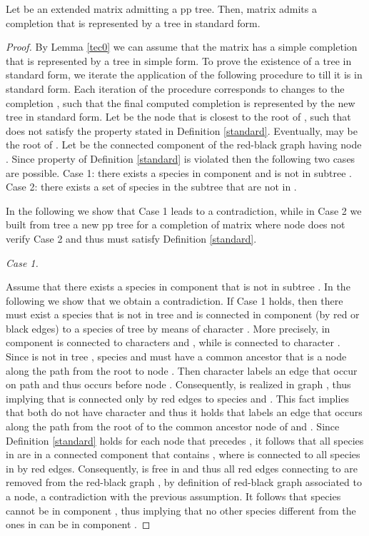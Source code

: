 \documentclass{llncs}
\begin{document}
\begin{lemma}
\label{tec1}
Let   be an extended matrix admitting a pp tree. Then, matrix  admits a completion that is represented by a tree  in standard form.
\end{lemma}

\begin{proof}
By Lemma  \ref{tec0} we can assume that the matrix  has a simple completion  
that is represented by a tree  in simple form.
To prove the existence of a tree  in standard form, we iterate the application of the following procedure to  till it is in standard form.  Each iteration of the procedure corresponds to changes to the completion ,
such that the  final computed completion   is represented by the new tree in standard form. 
Let  be the node that is closest to the root  of , such that  does not satisfy  the property stated in Definition \ref{standard}.  Eventually,  may be the root of .
 Let  be the connected component of  the red-black graph   having node .  Since property of   Definition \ref{standard} is violated then the following two cases are possible.
Case 1: there exists a species  in component  and  is not in subtree .
Case 2:  there exists a set  of species in the subtree  that are not in .


In the following we show that Case 1 leads to a contradiction, while in Case 2 we built  from tree   a new pp tree  for a completion of matrix   where node  does not verify Case 2 and thus  must satisfy Definition \ref{standard}.


 {\em Case 1.}
 
Assume that there exists a species in component  that is  not in subtree .
In the following we show that we obtain a contradiction.  If Case 1 holds, then there must exist a species   that is not in tree   and  is connected in component  (by  red or black edges) to a species  of tree   by means of character . More precisely, in component   is connected to characters   and , while  is connected to character .  Since  is not in tree , species  and  must have a common ancestor that is a node  along the path  from the root  to node .    
Then  character  labels an edge that occur on path  and thus  occurs before node .  Consequently,    is realized in graph , thus implying that  is connected  only by red edges to species  and . This fact implies that both   do not have character  and thus it holds that   labels an edge that occurs along the path from the root of  to the common ancestor node  of  and . 
 Since Definition \ref{standard} holds for each node that precedes ,  it follows that all species in  are in a connected component  that contains , where  is connected to all species in  by red edges. Consequently,   is free in  and thus all red edges connecting  to  are removed from the red-black graph , by definition of red-black graph associated to a node, a contradiction
with the previous assumption. It follows that  species  cannot be in component , thus implying that no other species different from the ones in   can be in component .
 

\end{proof}
\end{document}

